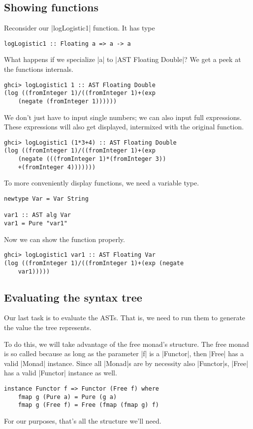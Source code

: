 \documentclass[preprint]{sigplanconf}
\theoremstyle{definition}
\begin{document}
\subsection{Showing functions}
Reconsider our |logLogistic1| function.
It has type
\begin{lstlisting}
logLogistic1 :: Floating a => a -> a
\end{lstlisting}
What happens if we specialize |a| to |AST Floating Double|?
We get a peek at the functions internals.
\begin{lstlisting}
ghci> logLogistic1 1 :: AST Floating Double
(log ((fromInteger 1)/((fromInteger 1)+(exp
    (negate (fromInteger 1))))))
\end{lstlisting}
We don't just have to input single numbers;
we can also input full expressions.
These expressions will also get displayed,
intermixed with the original function.
\begin{lstlisting}
ghci> logLogistic1 (1*3+4) :: AST Floating Double
(log ((fromInteger 1)/((fromInteger 1)+(exp
    (negate (((fromInteger 1)*(fromInteger 3))
    +(fromInteger 4)))))))
\end{lstlisting}
To more conveniently display functions,
we need a variable type.
\begin{lstlisting}
newtype Var = Var String

var1 :: AST alg Var
var1 = Pure "var1"
\end{lstlisting}
Now we can show the function properly.
\begin{lstlisting}
ghci> logLogistic1 var1 :: AST Floating Var
(log ((fromInteger 1)/((fromInteger 1)+(exp (negate
    var1)))))
\end{lstlisting}

\subsection{Evaluating the syntax tree}
Our last task is to evaluate the ASTs.
That is, we need to run them to generate the value the tree represents.

To do this, we will take advantage of the free monad's structure.
The free monad is so called because as long as the parameter |f| is a |Functor|,
then |Free| has a valid |Monad| instance.
Since all |Monad|s are by necessity also |Functor|s,
|Free| has a valid |Functor| instance as well.
\begin{lstlisting}
instance Functor f => Functor (Free f) where
    fmap g (Pure a) = Pure (g a)
    fmap g (Free f) = Free (fmap (fmap g) f)
\end{lstlisting}
For our purposes, that's all the structure we'll need.
\end{document}
